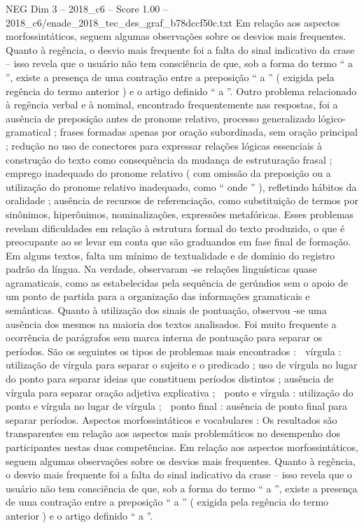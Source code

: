 \begin{textsample}{NEG Dim 3 – 2018\_c6 – Score 1.00 – 2018\_c6/enade\_2018\_tec\_des\_graf\_b78dccf50c.txt}
Em relação aos aspectos morfossintáticos, seguem algumas observações sobre os desvios mais frequentes.
Quanto à regência, o desvio mais frequente foi a falta do sinal indicativo da crase – isso revela que o usuário não tem consciência de que, sob a forma do termo “ a ”, existe a presença de uma contração entre a preposição “ a ” ( exigida pela regência do termo anterior ) e o artigo definido “ a ”.
Outro problema relacionado à regência verbal e à nominal, encontrado frequentemente nas respostas, foi a ausência de preposição antes de pronome relativo, processo generalizado lógico-gramatical ; frases formadas apenas por oração subordinada, sem oração principal ; redução no uso de conectores para expressar relações lógicas essenciais à construção do texto como consequência da mudança de estruturação frasal ; emprego inadequado do pronome relativo ( com omissão da preposição ou a utilização do pronome relativo inadequado, como “ onde ” ), refletindo hábitos da oralidade ; ausência de recursos de referenciação, como substituição de termos por sinônimos, hiperônimos, nominalizações, expressões metafóricas.
Esses problemas revelam dificuldades em relação à estrutura formal do texto produzido, o que é preocupante ao se levar em conta que são graduandos em fase final de formação.
Em alguns textos, falta um mínimo de textualidade e de domínio do registro padrão da língua.
Na verdade, observaram -se relações linguísticas quase agramaticais, como as estabelecidas pela sequência de gerúndios sem o apoio de um ponto de partida para a organização das informações gramaticais e semânticas.
Quanto à utilização dos sinais de pontuação, observou -se uma ausência dos mesmos na maioria dos textos analisados.
Foi muito frequente a ocorrência de parágrafos sem marca interna de pontuação para separar os períodos.
São os seguintes os tipos de problemas mais encontrados :  vírgula : utilização de vírgula para separar o sujeito e o predicado ; uso de vírgula no lugar do ponto para separar ideias que constituem períodos distintos ; ausência de vírgula para separar oração adjetiva explicativa ;  ponto e vírgula : utilização do ponto e vírgula no lugar de vírgula ;  ponto final : ausência de ponto final para separar períodos.
Aspectos morfossintáticos e vocabulares : Os resultados são transparentes em relação aos aspectos mais problemáticos no desempenho dos participantes nestas duas competências.
Em relação aos aspectos morfossintáticos, seguem algumas observações sobre os desvios mais frequentes.
Quanto à regência, o desvio mais frequente foi a falta do sinal indicativo da crase – isso revela que o usuário não tem consciência de que, sob a forma do termo “ a ”, existe a presença de uma contração entre a preposição “ a ” ( exigida pela regência do termo anterior ) e o artigo definido “ a ”.

\end{textsample}
